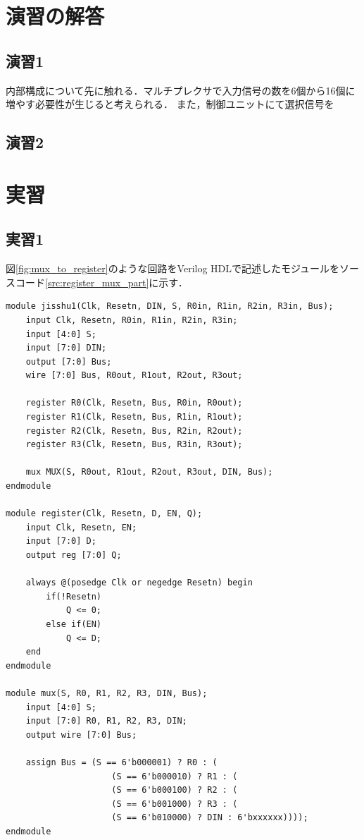 \documentclass{jlreq}
\numberwithin{equation}{section}
\begin{document}
\section{演習の解答}
\subsection{演習1}
内部構成について先に触れる．マルチプレクサで入力信号の数を6個から16個に増やす必要性が生じると考えられる．
また，制御ユニットにて選択信号を

\subsection{演習2}

\section{実習}
\subsection{実習1}
図\ref{fig:mux_to_register}のような回路をVerilog HDLで記述したモジュールをソースコード\ref{src:register_mux_part}に示す．
\begin{lstlisting}[caption={実習1のモジュール}, label={src:register_mux_part}]
module jisshu1(Clk, Resetn, DIN, S, R0in, R1in, R2in, R3in, Bus);
	input Clk, Resetn, R0in, R1in, R2in, R3in;
	input [4:0] S;
	input [7:0] DIN;
	output [7:0] Bus;
	wire [7:0] Bus, R0out, R1out, R2out, R3out;
	
	register R0(Clk, Resetn, Bus, R0in, R0out);
	register R1(Clk, Resetn, Bus, R1in, R1out);
	register R2(Clk, Resetn, Bus, R2in, R2out);
	register R3(Clk, Resetn, Bus, R3in, R3out);
	
	mux MUX(S, R0out, R1out, R2out, R3out, DIN, Bus);
endmodule

module register(Clk, Resetn, D, EN, Q);
	input Clk, Resetn, EN;
	input [7:0] D;
	output reg [7:0] Q;
	
	always @(posedge Clk or negedge Resetn) begin
		if(!Resetn)
			Q <= 0;
		else if(EN)
			Q <= D;
	end
endmodule

module mux(S, R0, R1, R2, R3, DIN, Bus);
	input [4:0] S;
	input [7:0] R0, R1, R2, R3, DIN;
	output wire [7:0] Bus;
	
	assign Bus = (S == 6'b000001) ? R0 : (
					 (S == 6'b000010) ? R1 : (
					 (S == 6'b000100) ? R2 : (
					 (S == 6'b001000) ? R3 : (
					 (S == 6'b010000) ? DIN : 6'bxxxxxx))));
endmodule
\end{lstlisting}
\end{document}
